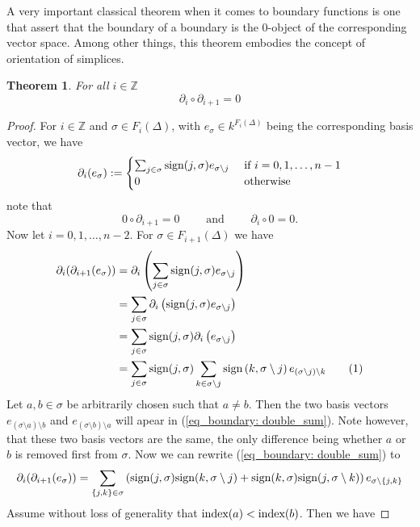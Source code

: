 \documentclass[11pt,a4paper,twoside]{report}
\newtheorem{mythm}{Theorem}[chapter]
\newcommand\numberthis{\addtocounter{equation}{1}\tag{\theequation}}
\begin{document}
A very important classical theorem when it comes to boundary functions is one that assert that the boundary of a boundary is the 0-object of the corresponding vector space. Among other things, this theorem embodies the concept of orientation of simplices.
\begin{mythm}\label{thm:boundary}
For all $i\in\mathbb{Z}$ 
\begin{equation*}
\partial_i\circ\partial_{i+1}=0
\end{equation*}
\end{mythm}
\begin{proof}
For $i\in\mathbb{Z}$ and $\sigma\in F_i(\Delta)$, with $e_\sigma\in k^{F_i(\Delta)}$ being the corresponding basis vector, we have 
\begin{equation*}
\partial_i(e_\sigma):=
\begin{cases}
\sum_{j\in\sigma}\textnormal{sign}(j,\sigma)e_{\sigma\setminus j} & \textnormal{ if } i=0,1,\dots,n-1 \\
0 & \textnormal{ otherwise}
\end{cases}
\end{equation*}
note that 
\begin{equation*}
0\circ\partial_{i+1}=0 \qquad \text{ and } \qquad \partial_i\circ 0 = 0.
\end{equation*}
Now let $i=0,1,\dots,n-2$. For $\sigma\in F_{i+1}(\Delta)$ we have
\begin{align*}
\partial_i(\partial_{i+1}(e_\sigma))&=\partial_i\left(\sum_{j\in\sigma}\textnormal{sign}(j,\sigma)e_{\sigma\setminus j}\right) \\
&=\sum_{j\in\sigma}\partial_i\left(\textnormal{sign}(j,\sigma)e_{\sigma\setminus j}\right)\\
&=\sum_{j\in\sigma}\textnormal{sign}(j,\sigma)\partial_i\left(e_{\sigma\setminus j}\right)\\
&=\sum_{j\in\sigma}\textnormal{sign}(j,\sigma)\sum_{k\in\sigma\setminus j}\textnormal{sign}\left(k,\sigma\setminus j\right)e_{(\sigma\setminus j)\setminus k}\numberthis \label{eq_boundary: double_sum}\\
\end{align*}
Let $a,b\in\sigma$ be arbitrarily chosen such that $a\not=b$. Then the two basis vectors $e_{(\sigma\setminus a)\setminus b}$ and $e_{(\sigma\setminus b)\setminus a}$ will apear in (\ref{eq_boundary: double_sum}). Note however, that these two basis vectors are the same, the only difference being whether $a$ or $b$ is removed first from $\sigma$. Now we can rewrite (\ref{eq_boundary: double_sum}) to
\begin{equation}
\partial_i(\partial_{i+1}(e_\sigma))=\sum_{\{j,k\}\in\sigma}\left(\textnormal{sign}(j,\sigma)\textnormal{sign}(k,\sigma\setminus j) + \textnormal{sign}(k,\sigma)\textnormal{sign}(j,\sigma\setminus k)\right)e_{\sigma\setminus\{j,k\}} \label{eq_boundary: 0}
\end{equation}
Assume without loss of generality that $\textnormal{index}(a)<\textnormal{index}(b)$. Then we have 


\end{proof}
\end{document}
